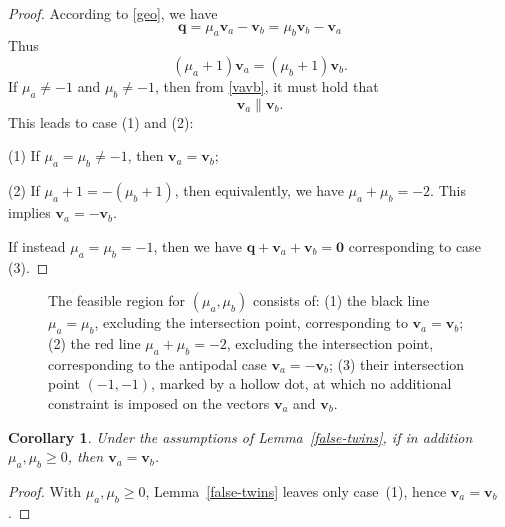 \documentclass[11pt,reqno]{amsart}
\newtheorem{corollary}[theorem]{Corollary}
\theoremstyle{definition}
\begin{document}
\begin{proof}
According to \eqref{geo}, we have
$$\boldsymbol{q}=\mu_a\boldsymbol{v}_a-\boldsymbol{v}_b=\mu_b\boldsymbol{v}_b-\boldsymbol{v}_a$$
Thus
\begin{equation}\label{vavb}
    (\mu_a + 1)\boldsymbol{v}_a = (\mu_b + 1)\boldsymbol{v}_b.
\end{equation}
If \(\mu_a \neq -1\) and \(\mu_b \neq -1\), then from \eqref{vavb}, it must hold that
\[ \boldsymbol{v}_a \parallel \boldsymbol{v}_b. \]
This leads to case (1) and (2):

(1) If \(\mu_a = \mu_b\neq -1\), then \(\boldsymbol{v}_a = \boldsymbol{v}_b\);

(2) If \(\mu_a + 1 = -(\mu_b + 1)\), then equivalently, we have \(\mu_a + \mu_b = -2\). This implies $\boldsymbol{v}_a = -\boldsymbol{v}_b$.

\noindent
If instead $\mu_a=\mu_b=-1$, then we have $\boldsymbol{q} + \boldsymbol{v}_a +\boldsymbol{v}_b = \boldsymbol{0}$ corresponding to case (3).
\end{proof}

\begin{figure}[H]
\centering
{}
\caption{The feasible region for $(\mu_a,\mu_b)$ consists of:  
(1) the black line $\mu_a = \mu_b$, excluding the intersection point, corresponding to $\boldsymbol{v}_a = \boldsymbol{v}_b$;  
(2) the red line $\mu_a + \mu_b = -2$, excluding the intersection point, corresponding to the antipodal case $\boldsymbol{v}_a = -\boldsymbol{v}_b$;  
(3) their intersection point $(-1,-1)$, marked by a hollow dot, at which no additional constraint is imposed on the vectors $\boldsymbol{v}_a$ and $\boldsymbol{v}_b$.}
\end{figure}

\begin{corollary}\label{sync_twins}
Under the assumptions of Lemma~\ref{false-twins}, if in addition $\mu_a, \mu_b \ge 0$, then $\boldsymbol{v}_a = \boldsymbol{v}_b$.
\end{corollary}
\begin{proof}
With $\mu_a,\mu_b \ge 0$, Lemma~\ref{false-twins} leaves only case~(1), hence $\boldsymbol{v}_a=\boldsymbol{v}_b$.
\end{proof}
\end{document}
